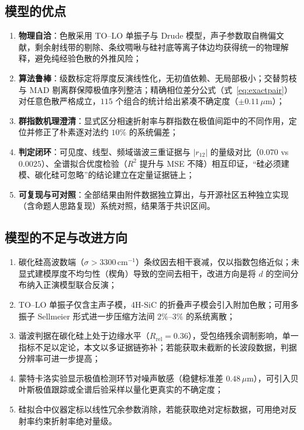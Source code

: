 \documentclass[11pt,a4paper,fontset=fandol]{ctexart}
\newcommand{\um}{\,\mu\mathrm{m}}
\newcommand{\invcm}{\,\mathrm{cm^{-1}}}
\begin{document}
\subsection{模型的优点}
\begin{enumerate}[label=（\arabic*）, leftmargin=2.4em, itemsep=0.1em]
    \item \textbf{物理自洽}：色散采用 TO--LO 单振子与 Drude 模型，声子参数取自椭偏文献\cite{madan2024}，剩余射线带的剔除、条纹啁啾与硅衬底等离子体边均获得统一的物理解释，避免纯经验色散的外推风险；
    \item \textbf{算法鲁棒}：级数标定将厚度反演线性化，无初值依赖、无局部极小；交替剪枝与 MAD 剔离群保障极值序列整洁；精确相位差分公式（式~\eqref{eq:exactpair}）对任意色散严格成立，$115$ 个组合的统计给出紧凑不确定度（$\pm0.11\um$）；
    \item \textbf{群指数机理澄清}：显式区分相速折射率与群指数在极值间距中的不同作用，定位并修正了朴素逐对法约 $10\%$ 的系统偏差；
    \item \textbf{判定闭环}：可见度、线型、频域谐波三重证据与 $|r_{12}|$ 的量级对比（$0.070$ vs $0.0025$）、全谱拟合优度检验（$R^2$ 提升与 MSE 不降）相互印证，``硅必须建模、碳化硅可忽略''的结论建立在定量证据链上；
    \item \textbf{可复现与可对照}：全部结果由附件数据独立算出，与开源社区五种独立实现（含命题人思路复现\cite{jiebro2025}）系统对照，结果落于共识区间。
\end{enumerate}

\subsection{模型的不足与改进方向}
\begin{enumerate}[label=（\arabic*）, leftmargin=2.4em, itemsep=0.1em]
    \item 碳化硅高波数端（$\sigma>3300\invcm$）条纹因去相干衰减，仅以指数包络近似；未显式建模厚度不均匀性（楔角）导致的空间去相干，改进方向是将 $d$ 的空间分布纳入正演模型联合反演；
    \item TO--LO 单振子仅含主声子模，4H-SiC 的折叠声子模会引入附加色散；可用多振子 Sellmeier 形式进一步压缩方法间 $2\%\text{--}3\%$ 的系统离散；
    \item 谐波判据在碳化硅上处于边缘水平（$R_{\mathrm{rel}}=0.36$），受包络残余调制影响，单一指标不足以定论，本文以多证据链弥补；若能获取未截断的长波段数据，判据分辨率可进一步提高；
    \item 蒙特卡洛实验显示极值检测环节对噪声敏感（稳健标准差 $0.48\um$），可引入贝叶斯极值跟踪或全谱后验采样以量化更真实的不确定度；
    \item 硅拟合中仪器定标以线性冗余参数消除，若能获取绝对定标数据，可用绝对反射率约束折射率绝对量级。
\end{enumerate}
\end{document}
